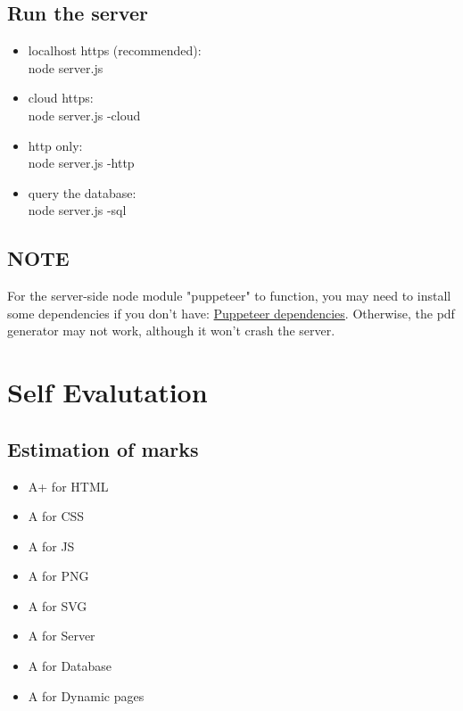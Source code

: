 \documentclass[11pt]{article}
\begin{document}
\begin{spacing}{1.0}
	\subsection{Run the server}
	\begin{itemize}
  		\item localhost https (recommended):\\
  		\hspace*{1cm} node server.js
  		\item cloud https:\\
  		\hspace*{1cm} node server.js -cloud
  		\item http only:\\
  		\hspace*{1cm} node server.js -http
  		\item query the database:\\
  		\hspace*{1cm} node server.js -sql
	\end{itemize}

	\subsection{NOTE}
	For the server-side node module "puppeteer" to function, you may need to install some dependencies if you don't have:
	\href{https://github.com/puppeteer/puppeteer/blob/master/docs/troubleshooting.md#chrome-headless-doesnt-launch-on-unix%20dependencies}{Puppeteer dependencies}.
	Otherwise, the pdf generator may not work, although it won't crash the server.
		
	\section{Self Evalutation}
	\subsection{Estimation of marks}
\begin{itemize}
	\item A+ for HTML
	\item A for CSS
	\item A for JS
	\item A for PNG	
	\item A for SVG
	\item A for Server
	\item A for Database
	\item A for Dynamic pages
\end{itemize}

\end{spacing}
\end{document}
